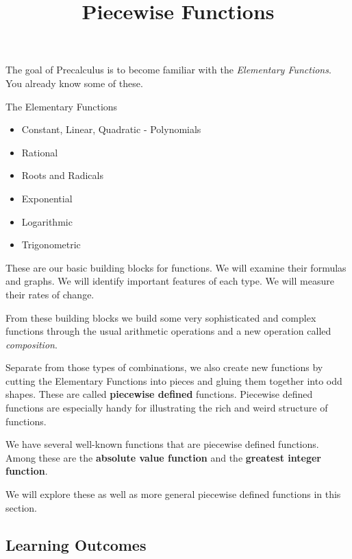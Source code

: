 \documentclass{ximera}
\title{Piecewise Functions}
\begin{document}
\begin{abstract}
\end{abstract}
\maketitle



The goal of Precalculus is to become familiar with the \textit{Elementary Functions}. You already know some of these.


\begin{summary} The Elementary Functions
	\begin{itemize}
		\item Constant, Linear, Quadratic - Polynomials
		\item Rational
		\item Roots and Radicals
		\item Exponential
		\item Logarithmic
		\item Trigonometric
	\end{itemize}
\end{summary}




These are our basic building blocks for functions.  We will examine their formulas and graphs.  We will identify important features of each type. We will measure their rates of change. 

From these building blocks we build some very sophisticated and complex functions through the usual arithmetic operations and a new operation called \textit{composition}. 

Separate from those types of combinations, we also create new functions by cutting the Elementary Functions into pieces and gluing them together into odd shapes.   These are called \textbf{piecewise defined} functions.  Piecewise defined functions are especially handy for illustrating the rich and weird structure of functions.


We have several well-known functions that are piecewise defined functions. Among these are the \textbf{absolute value function} and the \textbf{greatest integer function}.

We will explore these as well as more general piecewise defined functions in this section. \\






\subsection{Learning Outcomes}
\end{document}
